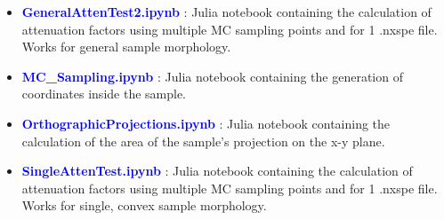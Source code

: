 \documentclass{article}
\begin{document}
\begin{itemize}
\begin{itemize}
\begin{itemize}
            \item \textcolor{blue}{\textbf{GeneralAttenTest2.ipynb}} : Julia notebook containing the calculation of attenuation factors using multiple MC sampling points and for 1 .nxspe file. Works for general sample morphology.
            \item \textcolor{blue}{\textbf{MC\_Sampling.ipynb}} : Julia notebook containing the generation of coordinates inside the sample.
            \item \textcolor{blue}{\textbf{OrthographicProjections.ipynb}} : Julia notebook containing the calculation of the area of the sample's projection on the x-y plane.
            \item \textcolor{blue}{\textbf{SingleAttenTest.ipynb}} : Julia notebook containing the calculation of attenuation factors using multiple MC sampling points and for 1 .nxspe file. Works for single, convex sample morphology.
        \end{itemize}
    \end{itemize}
\end{itemize}
\end{document}
